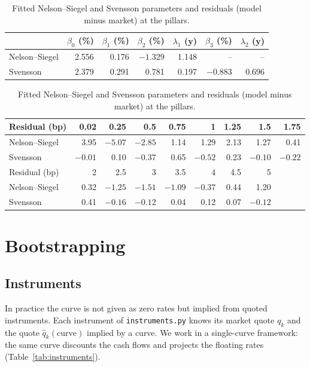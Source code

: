 \documentclass[11pt,a4paper]{article}
\theoremstyle{plain}
\theoremstyle{definition}
\begin{document}
\begin{table}[htbp]
\centering
\small
\begin{tabular}{@{}lrrrrrr@{}}
\toprule
& $\beta_0$ (\%) & $\beta_1$ (\%) & $\beta_2$ (\%) & $\lambda_1$ (y) & $\beta_3$ (\%) & $\lambda_2$ (y) \\
\midrule
Nelson--Siegel & 2.556 & 0.176 & $-1.329$ & 1.148 & -- & -- \\
Svensson & 2.379 & 0.291 & 0.781 & 0.197 & $-0.883$ & 0.696 \\
\bottomrule
\end{tabular}

\vspace{3mm}
\begin{tabular}{@{}lrrrrrrrr@{}}
\toprule
Residual (bp) & 0.02 & 0.25 & 0.5 & 0.75 & 1 & 1.25 & 1.5 & 1.75 \\
\midrule
Nelson--Siegel & 3.95 & $-5.07$ & $-2.85$ & 1.14 & 1.29 & 2.13 & 1.27 & 0.41 \\
Svensson & $-0.01$ & 0.10 & $-0.37$ & 0.65 & $-0.52$ & 0.23 & $-0.10$ & $-0.22$ \\
\midrule
Residual (bp) & 2 & 2.5 & 3 & 3.5 & 4 & 4.5 & 5 & \\
\midrule
Nelson--Siegel & 0.32 & $-1.25$ & $-1.51$ & $-1.09$ & $-0.37$ & 0.44 & 1.20 & \\
Svensson & 0.41 & $-0.16$ & $-0.12$ & 0.04 & 0.12 & 0.07 & $-0.12$ & \\
\bottomrule
\end{tabular}
\caption{Fitted Nelson--Siegel and Svensson parameters and residuals (model minus market) at the pillars.}
\label{tab:ns}
\end{table}

\clearpage
\section{Bootstrapping}
\label{sec:bootstrap}

\subsection{Instruments}
In practice the curve is not given as zero rates but implied from quoted instruments. Each instrument of \texttt{instruments.py} knows its market quote $q_k$ and the quote $\hat q_k(\text{curve})$ implied by a curve. We work in a single-curve framework: the same curve discounts the cash flows and projects the floating rates (Table~\ref{tab:instruments}).
\end{document}
